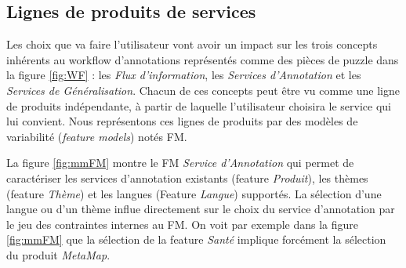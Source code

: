 \documentclass[]{easychair}
\begin{document}


\subsection{Lignes de produits de services}
Les choix que va faire l'utilisateur vont avoir un impact sur les trois concepts inhérents au workflow d'annotations représentés comme des pièces de puzzle dans la figure \ref{fig:WF} : les \textit{Flux d'information}, les \textit{Services d'Annotation} et les \textit{Services de Généralisation}. Chacun de ces concepts peut être vu comme une ligne de produits indépendante, à partir de laquelle l'utilisateur choisira le service qui lui convient. Nous représentons ces lignes de produits par des modèles de variabilité (\textsl{feature models}) notés FM.

La figure \ref{fig:mmFM} montre le FM \textit{Service d'Annotation} qui permet de caractériser les services d'annotation existants (feature \textit{Produit}), les thèmes (feature \textit{Thème}) et les langues (Feature \textit{Langue}) supportés. La sélection d'une langue ou d'un thème influe directement sur le choix du service d'annotation par le jeu des contraintes internes au FM. On voit par exemple dans la figure \ref{fig:mmFM} que la sélection de la feature \textit{Santé} implique forcément la sélection du produit \textit{MetaMap}.


\end{document}
